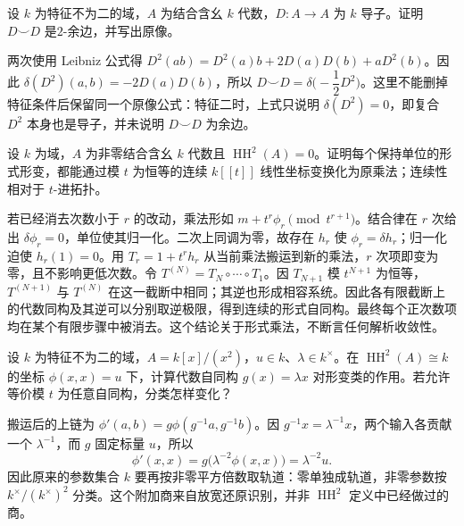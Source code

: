 \begin{optionalexercise}\label{b4:ex:12-cup-derivation-square}
	设 \(k\) 为特征不为二的域，\(A\) 为结合含幺 \(k\) 代数，\(D:A\to A\) 为 \(k\) 导子。证明 \(D\smile D\) 是\(2\)-余边，并写出原像。
\end{optionalexercise}
\begin{solution}
	两次使用 Leibniz 公式得 \(D^2(ab)=D^2(a)b+2D(a)D(b)+aD^2(b)\)。因此 \(\delta(D^2)(a,b)=-2D(a)D(b)\)，所以 \(D\smile D=\delta\bigl(-\dfrac12D^2\bigr)\)。这里不能删掉特征条件后保留同一个原像公式：特征二时，上式只说明 \(\delta(D^2)=0\)，即复合 \(D^2\) 本身也是导子，并未说明 \(D\smile D\) 为余边。
\end{solution}

\begin{optionalexercise}\label{b4:ex:12-formal-rigidity}
	设 \(k\) 为域，\(A\) 为非零结合含幺 \(k\) 代数且 \(\operatorname{HH}^2(A)=0\)。证明每个保持单位的形式形变，都能通过模 \(t\) 为恒等的连续 \(k[\![t]\!]\) 线性坐标变换化为原乘法；连续性相对于 \(t\)-进拓扑。
\end{optionalexercise}
\begin{solution}
	若已经消去次数小于 \(r\) 的改动，乘法形如 \(m+t^r\phi_r\pmod {t^{r+1}}\)。结合律在 \(r\) 次给出 \(\delta\phi_r=0\)，单位使其归一化。二次上同调为零，故存在 \(h_r\) 使 \(\phi_r=\delta h_r\)；归一化迫使 \(h_r(1)=0\)。用 \(T_r=1+t^rh_r\) 从当前乘法搬运到新的乘法，\(r\) 次项即变为零，且不影响更低次数。令 \(T^{(N)}=T_N\circ\cdots\circ T_1\)。因 \(T_{N+1}\) 模 \(t^{N+1}\) 为恒等，\(T^{(N+1)}\) 与 \(T^{(N)}\) 在这一截断中相同；其逆也形成相容系统。因此各有限截断上的代数同构及其逆可以分别取逆极限，得到连续的形式自同构。最终每个正次数项均在某个有限步骤中被消去。这个结论关于形式乘法，不断言任何解析收敛性。
\end{solution}

\begin{optionalexercise}\label{b4:ex:12-automorphism-orbits}
	设 \(k\) 为特征不为二的域，\(A=k[x]/(x^2)\)，\(u\in k\)、\(\lambda\in k^\times\)。在 \(\operatorname{HH}^2(A)\cong k\) 的坐标 \(\phi(x,x)=u\) 下，计算代数自同构 \(g(x)=\lambda x\) 对形变类的作用。若允许等价模 \(t\) 为任意自同构，分类怎样变化？
\end{optionalexercise}
\begin{solution}
	搬运后的上链为 \(\phi'(a,b)=g\phi(g^{-1}a,g^{-1}b)\)。因 \(g^{-1}x=\lambda^{-1}x\)，两个输入各贡献一个 \(\lambda^{-1}\)，而 \(g\) 固定标量 \(u\)，所以
	\[
		\phi'(x,x)=g\bigl(\lambda^{-2}\phi(x,x)\bigr) =\lambda^{-2}u.
	\]
	因此原来的参数集合 \(k\) 要再按非零平方倍数取轨道：零单独成轨道，非零参数按 \(k^\times/(k^\times)^2\) 分类。这个附加商来自放宽还原识别，并非 \(\operatorname{HH}^2\) 定义中已经做过的商。
\end{solution}

